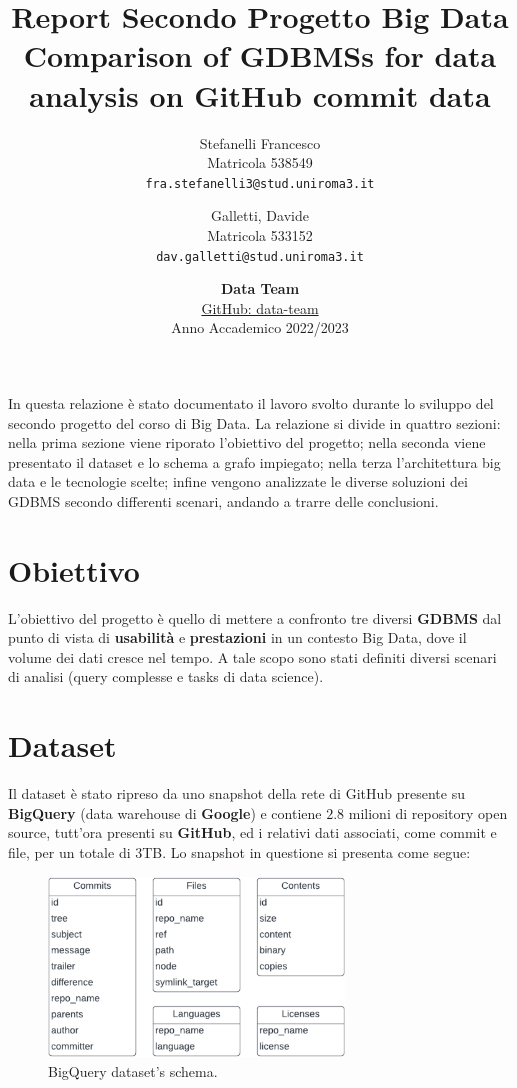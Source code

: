 \documentclass[11pt]{article}
\author{
 Stefanelli Francesco \\
 Matricola 538549\\
 \texttt{fra.stefanelli3@stud.uniroma3.it}
 \and
 Galletti, Davide \\
 Matricola 533152\\
 \texttt{dav.galletti@stud.uniroma3.it}
}
\title{\huge\textbf{Report Secondo Progetto Big Data} \\ \Large Comparison of GDBMSs for data analysis on GitHub commit data }
\date{\textbf{Data Team} \\
\href{https://github.com/BD-Data-Team/second-project-bigdata}{GitHub: data-team}\\
Anno Accademico 2022/2023}
\begin{document}
\maketitle
In questa relazione è stato documentato il lavoro svolto durante lo sviluppo del secondo progetto del corso di Big Data.
La relazione si divide in quattro sezioni: nella prima sezione viene riporato l'obiettivo del progetto; nella seconda viene presentato il dataset e lo schema a grafo impiegato; nella terza l'architettura big data e le tecnologie scelte; infine vengono analizzate le diverse soluzioni dei GDBMS secondo differenti scenari, andando a trarre delle conclusioni.


\section{Obiettivo}
L'obiettivo del progetto è quello di mettere a confronto tre diversi \textbf{GDBMS} dal punto di vista di \textbf{usabilità} e \textbf{prestazioni} in un contesto Big Data, dove il volume dei dati cresce nel tempo. A tale scopo sono stati definiti diversi scenari di analisi (query complesse e tasks di data science).

\section{Dataset}
Il dataset è stato ripreso da uno snapshot della rete di GitHub presente su \textbf{BigQuery} (data warehouse di \textbf{Google}) e contiene $2.8$ milioni di repository open source, tutt'ora presenti su \textbf{GitHub}, ed i relativi dati associati, come commit e file, per un totale di $3$TB.
Lo snapshot in questione si presenta come segue:
\begin{figure}[!h]
    \centering
    \includegraphics[width=0.7\textwidth]{./images/old_schema_BQ.png}
    \caption{BigQuery dataset's schema.}
    \label{image:db_schema}
\end{figure}
\end{document}
